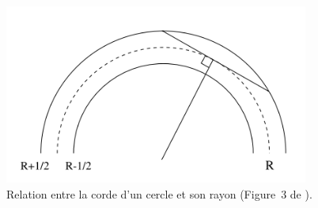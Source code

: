 \begin{figure}[ht]{
    \begin{center}
    \includegraphics[width=10cm]{images/Notions/MDSS1}
    \end{center}}
    \caption[Relation entre la corde d'un cercle et son rayon.]{Relation entre la corde d'un cercle et son rayon (Figure~3 de \cite{Coeurjolly2001}). \label{fig:mdss-chord}}
\end{figure}

